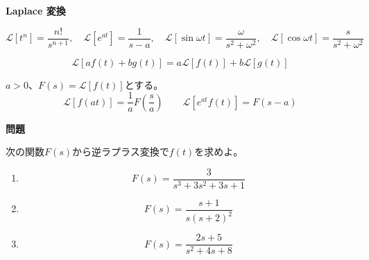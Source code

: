 \documentclass[12pt,b5paper]{ltjsarticle}
\begin{document}
\hrulefill
\textbf{Laplace 変換}
\hrulefill



\begin{equation}
 \mathcal{L}[t^n] = \frac{n!}{s^{n+1}}, \quad
 \mathcal{L}[e^{at}] = \frac{1}{s-a}, \quad
 \mathcal{L}[\sin \omega t] = \frac{\omega}{s^2+\omega^2}, \quad
 \mathcal{L}[\cos \omega t] = \frac{s}{s^2+\omega^2}
\end{equation}

\begin{equation}
 \mathcal{L}[af(t)+bg(t)] = a\mathcal{L}[f(t)] + b\mathcal{L}[g(t)]
\end{equation}


$a>0$、$F(s)=\mathcal{L}[f(t)]$とする。
\begin{equation}
 \mathcal{L}[f(at)] = \frac{1}{a}F\left(\frac{s}{a}\right)
  \qquad
 \mathcal{L}[e^{at}f(t)] = F(s-a)
\end{equation}


\hrulefill
\textbf{問題}
\hrulefill

次の関数$F(s)$から逆ラプラス変換で$f(t)$を求めよ。
\begin{enumerate}
 \item
      \begin{equation}
       F(s) = \frac{3}{s^3+3s^2+3s+1}
      \end{equation}

 \item
      \begin{equation}
       F(s) = \frac{s+1}{s(s+2)^2}
      \end{equation}

 \item
      \begin{equation}
       F(s) = \frac{2s+5}{s^2+4s+8}
      \end{equation}

\end{enumerate}



\dotfill
\end{document}
